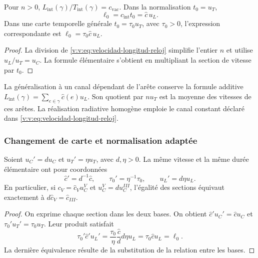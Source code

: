 \begin{corollary}
\label{v:v:cor:longitud-elemental-constitutiva}
Pour $n>0$, $L_{\mathrm{int}}(\gamma)/T_{\mathrm{int}}(\gamma)
=c_{\mathrm{vac}}$. Dans la normalisation $t_0=u_T$,
\begin{equation}
 \ell_0=c_{\mathrm{int}}t_0=\widehat c\,u_L.
 \label{v:v:eq:longitud-elemental-constitutiva}
\end{equation}
Dans une carte temporelle générale $t_0=\tau_0u_T$, avec $\tau_0>0$,
l’expression correspondante est $\ell_0=\tau_0\widehat c\,u_L$.
\end{corollary}
\begin{proof}
La division de \eqref{v:v:eq:velocidad-longitud-reloj} simplifie l’entier
$n$ et utilise $u_L/u_T=u_C$. La formule élémentaire s’obtient
en multipliant la section de vitesse par $t_0$.
\end{proof}

La généralisation à un canal dépendant de l’arête conserve la formule
additive $L_{\mathrm{int}}(\gamma)=\sum_{e\in\gamma}\widehat c(e)u_L$.
Son quotient par $nu_T$ est la moyenne des vitesses de ces arêtes.
La réalisation radiative homogène emploie le canal constant déclaré
dans \eqref{v:v:eq:velocidad-longitud-reloj}.

\subsubsection{Changement de carte et normalisation adaptée}

\begin{proposition}
\label{v:v:prop:covariancia-identidad-velocidad}
Soient $u_C'=d u_C$ et $u_T'=\eta u_T$, avec $d,\eta>0$.
La même vitesse et la même durée élémentaire ont pour coordonnées
\begin{equation}
 \widehat c'=d^{-1}\widehat c,
 \qquad \tau_0'=\eta^{-1}\tau_0,
 \qquad u_L'=d\eta u_L.
 \label{v:v:eq:velocidad-cambio-carta}
\end{equation}
En particulier, si $c_V=\widehat c_Vu_C^V$ et
$u_C^V=d u_C^{III}$, l’égalité des sections équivaut exactement à
$d\widehat c_V=\widehat c_{III}$.
\end{proposition}
\begin{proof}
On exprime chaque section dans les deux bases. On obtient
$\widehat c'u_C'=\widehat c u_C$ et
$\tau_0'u_T'=\tau_0u_T$. Leur produit satisfait
\[
 \tau_0'\widehat c' u_L'
 =\frac{\tau_0}{\eta}\frac{\widehat c}{d}
       d\eta u_L
 =\tau_0\widehat c u_L=\ell_0.
\]
La dernière équivalence résulte de la substitution de la relation entre les bases.
\end{proof}

